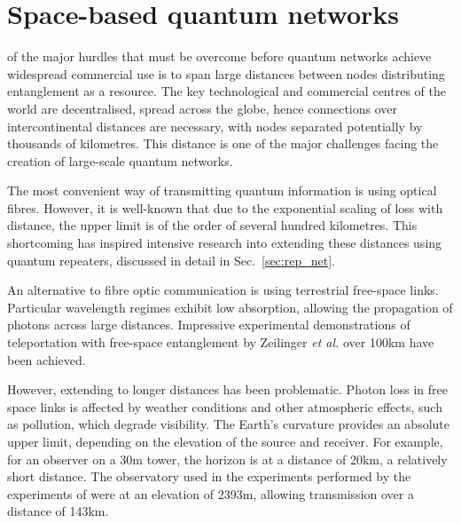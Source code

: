 %
%

\section{Space-based quantum networks}\label{sec:quant_space_race}

 of the major hurdles that must be overcome before quantum networks achieve widespread commercial use is to span large distances between nodes distributing entanglement as a resource. The key technological and commercial centres of the world are decentralised, spread across the globe, hence connections over intercontinental distances are necessary, with nodes separated potentially by thousands of kilometres. This distance is one of the major challenges facing the creation of large-scale quantum networks.

The most convenient way of transmitting quantum information is using optical fibres. However, it is well-known that due to the exponential scaling of loss with distance, the upper limit is of the order of several hundred kilometres. This shortcoming has inspired intensive research into extending these distances using quantum repeaters, discussed in detail in Sec.~\ref{sec:rep_net}.

An alternative to fibre optic communication is using terrestrial free-space links. Particular wavelength regimes exhibit low absorption, allowing the propagation of photons across large distances. Impressive experimental demonstrations of teleportation with free-space entanglement by Zeilinger \textit{et al.} \cite{bib:ursin07, bib:ma2012quantum, bib:yin2013lower} over 100km have been achieved.

However, extending to longer distances has been problematic. Photon loss in free space links is affected by weather conditions and other atmospheric effects, such as pollution, which degrade visibility. The Earth's curvature provides an absolute upper limit, depending on the elevation of the source and receiver. For example, for an observer on a 30m tower, the horizon is at a distance of 20km, a relatively short distance. The observatory used in the experiments performed by the experiments of \cite{bib:ursin07, bib:ma2012quantum} were at an elevation of 2393m, allowing transmission over a distance of 143km.

